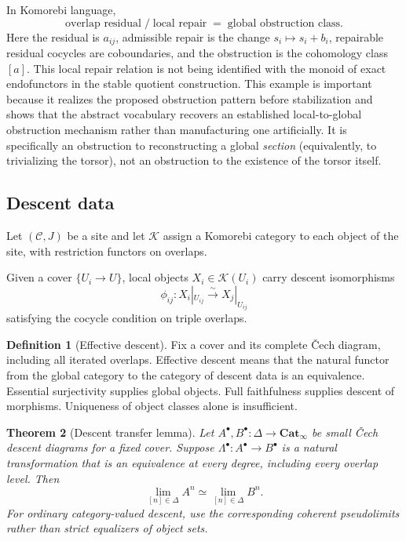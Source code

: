 \documentclass[11pt]{article}
\newtheorem{theorem}{Theorem}[section]
\theoremstyle{definition}
\newtheorem{definition}[theorem]{Definition}
\theoremstyle{remark}
\newcommand{\Cat}{\mathbf{Cat}}
\begin{document}
In Komorebi language,
\[
\boxed{
\text{overlap residual}
\;/\;
\text{local repair}
\;=\;
\text{global obstruction class}.}
\]
Here the residual is $a_{ij}$, admissible repair is the change $s_i\mapsto s_i+b_i$, repairable residual cocycles are coboundaries, and the obstruction is the cohomology class $[a]$. This local repair relation is not being identified with the monoid of exact endofunctors in the stable quotient construction. This example is important because it realizes the proposed obstruction pattern before stabilization and shows that the abstract vocabulary recovers an established local-to-global obstruction mechanism rather than manufacturing one artificially.
It is specifically an obstruction to reconstructing a global \emph{section} (equivalently, to trivializing the torsor), not an obstruction to the existence of the torsor itself.

\subsection{Descent data}

Let $(\mathcal C,J)$ be a site and let $\mathscr K$ assign a Komorebi category to each object of the site, with restriction functors on overlaps.

Given a cover $\{U_i\to U\}$, local objects $X_i\in\mathscr K(U_i)$ carry descent isomorphisms
\[
\phi_{ij}:X_i|_{U_{ij}}\xrightarrow{\sim}X_j|_{U_{ij}}
\]
satisfying the cocycle condition on triple overlaps.

\begin{definition}[Effective descent]
Fix a cover and its complete \v{C}ech diagram, including all iterated overlaps. Effective descent means that the natural functor from the global category to the category of descent data is an equivalence. Essential surjectivity supplies global objects. Full faithfulness supplies descent of morphisms. Uniqueness of object classes alone is insufficient.
\end{definition}

\begin{theorem}[Descent transfer lemma]\label{thm:descent-transfer}
Let $A^\bullet,B^\bullet:\Delta\to\Cat_\infty$ be small \v{C}ech descent diagrams for a fixed cover. Suppose $\Lambda^\bullet:A^\bullet\to B^\bullet$ is a natural transformation that is an equivalence at every degree, including every overlap level. Then
\[
\lim_{[n]\in\Delta} A^n\simeq\lim_{[n]\in\Delta} B^n.
\]
For ordinary category-valued descent, use the corresponding coherent pseudolimits rather than strict equalizers of object sets.
\end{theorem}
\end{document}
